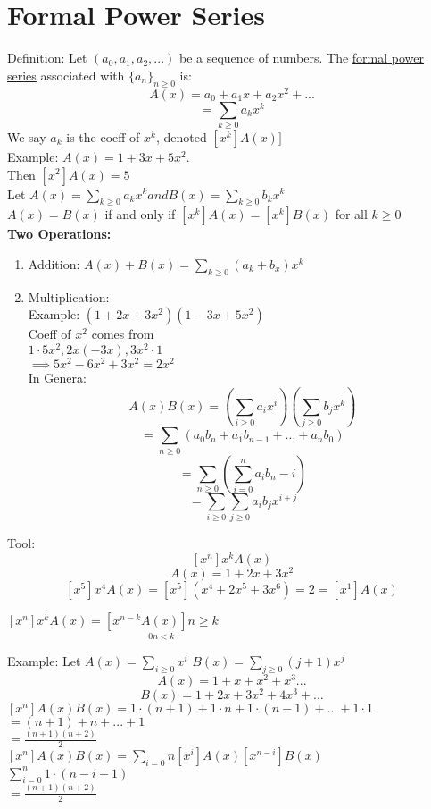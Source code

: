 \documentclass[12pt]{article}
\newcommand{\myt}[1]{\textbf{\underline{#1}}}
\begin{document}
	\section*{Formal Power Series}
	Definition: Let $(a_0, a_1, a_2,...)$ be a sequence of numbers. The \underline{formal power series} associated with $\{a_n\}_{n \geq 0}$ is:
	$$A(x) = a_0 + a_1x + a_2x^2 + ... $$
	$$ = \sum_{k \geq 0}a_kx^k$$
	We say $a_k$ is the coeff of $x^k$, denoted $[x^k]A(x)]$\\
	
	Example: $A(x) = 1 + 3x + 5x^2.$\\
	Then $[x^2]A(x) = 5$\\
	Let $A(x) = \sum_{k \geq 0}a_kx^k and B(x) = \sum_{k \geq 0}b_kx^k$\\
	$A(x) = B(x)$ if and only if $[x^k]A(x) = [x^k]B(x)$ for all $k \geq 0$\\
	
	\myt{Two Operations:}
	\begin{enumerate}
		\item Addition: $A(x) + B(x) = \sum_{k \geq 0}(a_k + b_x)x^k$
		\item Multiplication:\\
				Example: $(1 + 2x + 3x^2)(1 - 3x + 5x^2)$\\
				Coeff of $x^2$ comes from\\
				$1 \cdot 5x^2, 2x(-3x), 3x^2 \cdot 1$\\
				$\implies 5x^2 - 6x^2 + 3x^2 = 2x^2$\\
				In Genera:\\
				$$A(x)B(x) = (\sum_{i \geq 0}a_ix^i)(\sum_{j \geq 0}b_jx^k)$$
				$$ = \sum_{n \geq 0}(a_0b_n + a_1b_{n-1} + ... + a_nb_0)$$
				$$ = \sum_{n \geq 0}(\sum_{i = 0}^{n}a_ib_n-i)$$
				$$ = \sum_{i \geq 0}\sum_{j \geq 0}a_ib_jx^{i+j}$$
	\end{enumerate}
	Tool: 
	$$[x^n]x^kA(x)$$
	$$A(x) = 1 + 2x + 3x^2$$
	$$[x^5]x^4A(x) = [x^5](x^4 + 2x^5 + 3x^6) = 2 = [x^1]A(x)$$
	
	$[x^n]x^kA(x) = \underset{0 n < k}{[x^{n-k}A(x)] n \geq k}$
	
	Example: Let $A(x) = \sum_{i \geq 0}x^i$ $B(x) = \sum_{j \geq 0}(j+1)x^j$\\
	$$A(x) = 1+ x + x^2 + x^3 ... $$
	$$B(x) = 1 + 2x + 3x^2 + 4x^3 + ... $$
	$[x^n]A(x)B(x) = 1 \cdot (n+1) + 1 \cdot n + 1 \cdot (n - 1) + ... + 1 \cdot 1$\\
	$= (n + 1) + n + ... + 1$\\
	$ = \frac{(n+1)(n+2)}{2}$\\
	
	$[x^n]A(x)B(x) = \sum_{i = 0}{n}[x^i]A(x)[x^{n-i}]B(x)$\\
	$\sum_{i = 0}^{n}1 \cdot (n - i + 1)$\\
		$ = \frac{(n+1)(n+2)}{2}$\\
	
	
	
\end{document}
